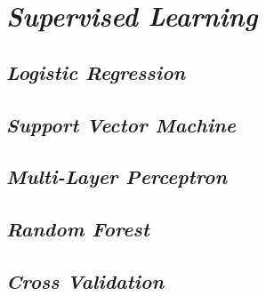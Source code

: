 \section{\textit{Supervised Learning}}

\lipsum[3]

\subsection{\textit{Logistic Regression}}

\lipsum[4]

\subsection{\textit{Support Vector Machine}}

\lipsum[5]

\subsection{\textit{Multi-Layer Perceptron}}

\lipsum[6]

\subsection{\textit{Random Forest}}

\lipsum[7]

\subsection{\textit{Cross Validation}}

\lipsum[8]
